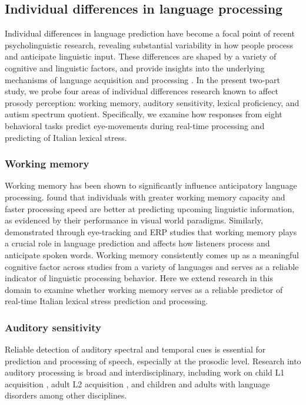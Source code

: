 \subsection{Individual differences in language processing}

Individual differences in language prediction have become a focal point of recent psycholinguistic research, revealing substantial variability in how people process and anticipate linguistic input. These differences are shaped by a variety of cognitive and linguistic factors, and provide insights into the underlying mechanisms of language acquisition and processing \citep{Huettig2016, Li2023, Kidd2018}. In the present two-part study, we probe four areas of individual differences research known to affect prosody perception: working memory, auditory sensitivity, lexical proficiency, and autism spectrum quotient. Specifically, we examine how responses from eight behavioral tasks predict eye-movements during real-time processing and predicting of Italian lexical stress.

\subsubsection{Working memory}
Working memory has been shown to significantly influence anticipatory language processing. \cite{Huettig2016} found that individuals with greater working memory capacity and faster processing speed are better at predicting upcoming linguistic information, as evidenced by their performance in visual world paradigms. Similarly, \cite{Li2023} demonstrated through eye-tracking and ERP studies that working memory plays a crucial role in language prediction and affects how listeners process and anticipate spoken words. Working memory consistently comes up as a meaningful cognitive factor across studies from a variety of languages and serves as a reliable indicator of linguistic processing behavior\citep{mchaney_et_al_2021_workingmemory, goss_2014, hadar_2016}. Here we extend research in this domain to examine whether working memory serves as a reliable predictor of real-time Italian lexical stress prediction and processing.

\subsubsection{Auditory sensitivity}
Reliable detection of auditory spectral and temporal cues is essential for prediction and processing of speech, especially at the prosodic level. Research into auditory processing is broad and interdisciplinary, including work on child L1 acquisition \citep{benasich2002infant}, adult L2 acquisition \citep{lengeris2010effect, kempe2012individual}, and children and adults with language disorders \citep{Liu2018, goswami2013impaired} among other disciplines. 


